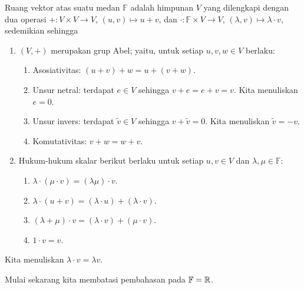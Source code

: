 \begin{defn}\label{preliminaries:defn:vectorspace}
    Ruang vektor atas suatu medan $\mathbb{F}$ adalah himpunan $V$ yang dilengkapi
    dengan dua operasi
    $+:V\times V\rightarrow V$, $(u,v)\mapsto u+v$, dan
    $\cdot:\mathbb{F}\times V\rightarrow V$,
    $(\lambda,v)\mapsto\lambda\cdot v$, sedemikian sehingga
    \begin{enumerate}
        \item $(V,+)$ merupakan grup Abel; yaitu, untuk setiap $u,v,w\in V$ berlaku:
        \begin{enumerate}
            \item Asosiativitas: $(u+v)+w=u+(v+w)$.
            \item Unsur netral: terdapat $e\in V$ sehingga
            $v+e=e+v=v$. Kita menuliskan $e=0$.
            \item Unsur invers: terdapat $\widetilde v\in V$ sehingga
            $v+\widetilde v=0$. Kita menuliskan $\widetilde v=-v$.
            \item Komutativitas: $v+w=w+v$.
        \end{enumerate}
        \item Hukum-hukum skalar berikut berlaku untuk setiap $u,v\in V$ dan
        $\lambda,\mu\in\mathbb{F}$:
        \begin{enumerate}
            \item $\lambda\cdot(\mu\cdot v)=(\lambda\mu)\cdot v$.
            \item $\lambda\cdot(u+v)=(\lambda\cdot u)+(\lambda\cdot v)$.
            \item $(\lambda+\mu)\cdot v=(\lambda\cdot v)+(\mu\cdot v)$.
            \item $1\cdot v=v$.
        \end{enumerate}
    \end{enumerate}
    Kita menuliskan $\lambda\cdot v=\lambda v$.
\end{defn}

Mulai sekarang kita membatasi pembahasan pada $\mathbb{F}=\mathbb{R}$.

